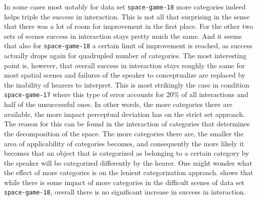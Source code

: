 In some cases most notably for data set {\footnotesize\tt space-game-18} 
more categories indeed helps triple the success in interaction. This is not all that
surprising in the sense that there was a lot of room for improvement in the 
first place. For the other two sets of scenes success in interaction stays 
pretty much the same. And it seems that also for {\footnotesize\tt space-game-18} a certain
limit of improvement is reached, as success actually drops again for quadrupled
number of categories. The most interesting point is, however, that overall 
success in interaction stays roughly the same for most spatial scenes 
and failures of the speaker to conceptualize
are replaced by the inability of hearers to interpret. This is most strikingly the case
in condition {\footnotesize\tt space-game-17} where this type of error accounts for 20\% of all
interactions and half of the unsuccessful ones. In other words, the more categories 
there are available, the more impact perceptual deviation has on the strict set approach.
The reason for this can be found in the interaction of categories that determines 
the decomposition of the space. The more categories there are, the smaller the 
area of applicability of categories
becomes, and consequently the more likely it becomes that an object that is
categorized as belonging to a certain category by the speaker will be 
categorized differently by the hearer. One might
wonder what the effect of more categories is on the lenient categorization
approach.  shows that while there
is some impact of more categories in the difficult scenes of data set
{\footnotesize\tt space-game-18}, overall there is no significant increase in success in
interaction.


